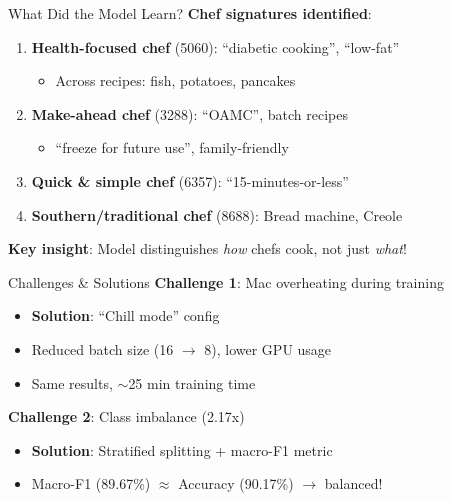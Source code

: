 \documentclass{beamer}
\begin{document}
\begin{frame}{What Did the Model Learn?}
\textbf{Chef signatures identified}:

\begin{enumerate}
    \item \textbf{Health-focused chef} (5060): ``diabetic cooking'', ``low-fat''
    \begin{itemize}
        \item Across recipes: fish, potatoes, pancakes
    \end{itemize}
    
    \item \textbf{Make-ahead chef} (3288): ``OAMC'', batch recipes
    \begin{itemize}
        \item ``freeze for future use'', family-friendly
    \end{itemize}
    
    \item \textbf{Quick \& simple chef} (6357): ``15-minutes-or-less''
    
    \item \textbf{Southern/traditional chef} (8688): Bread machine, Creole
\end{enumerate}

\vspace{0.3cm}
\textbf{Key insight}: Model distinguishes \emph{how} chefs cook, not just \emph{what}!
\end{frame}

\begin{frame}{Challenges \& Solutions}
\textbf{Challenge 1}: Mac overheating during training
\begin{itemize}
    \item \textbf{Solution}: ``Chill mode'' config
    \item Reduced batch size (16 $\rightarrow$ 8), lower GPU usage
    \item Same results, $\sim$25 min training time
\end{itemize}

\vspace{0.5cm}

\textbf{Challenge 2}: Class imbalance (2.17x)
\begin{itemize}
    \item \textbf{Solution}: Stratified splitting + macro-F1 metric
    \item Macro-F1 (89.67\%) $\approx$ Accuracy (90.17\%) $\rightarrow$ balanced!
\end{itemize}
\end{frame}
\end{document}
